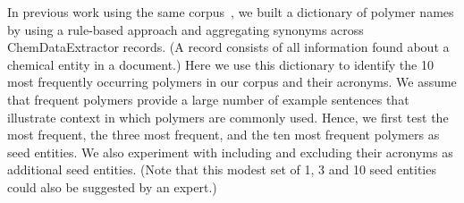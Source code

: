 In previous work using the same corpus~\cite{tchoua2016hybrid,tchoua2016hybridi}, 
we built a dictionary of polymer names by using a rule-based approach and aggregating synonyms across ChemDataExtractor records. (A record consists of all information found about a chemical entity in a document.)  
Here we use this dictionary to identify the 10 most frequently occurring polymers in our corpus and their acronyms.
We assume that frequent polymers provide a large number of example sentences that illustrate context in which polymers are commonly used.
Hence, we first test the most frequent, the three most frequent, and the ten most frequent polymers as seed entities.
We also experiment with including and excluding their acronyms as additional seed entities.
(Note that this modest set of 1, 3 and 10 seed entities could also be suggested by an expert.)

